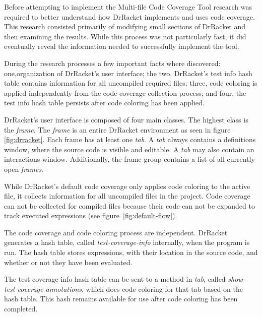 Before attempting to implement the Multi-file Code Coverage Tool research was required to better understand how DrRacket implements and uses code coverage. This research consisted primarily of modifying small sections of DrRacket and then examining the results. While this process was not particularly fast, it did eventually reveal the information needed to successfully implement the tool.

During the research processes a few important facts where discovered: one,organization of DrRacket's user interface; the two, DrRacket's test info hash table contains information for all uncompiled required files; three, code coloring is applied independently from the code coverage collection process; and four, the test info hash table persists after code coloring has been applied.

DrRacket's user interface is composed of four main classes. The highest class is the \emph{frame}. The \emph{frame} is an entire DrRacket environment as seen in figure \ref{fig:drracket}. Each frame has at least one \emph{tab}. A \emph{tab} always contains a definitions window, where the source code is visible and editable. A \emph{tab} may also contain an interactions window. Additionally, the frame group contains a list of all currently open \emph{frames}.


While DrRacket's default code coverage only applies code coloring to the active file, it collects information for all uncompiled files in the project. Code coverage can not be collected for compiled files because their code can not be expanded to track executed expressions (see figure~\ref{fig:default-flow}). 

The code coverage and code coloring process are independent. DrRacket generates a hash table, called \emph{test-coverage-info} internally, when the program is run. The hash table stores expressions, with their location in the source code, and whether or not they have been evaluated. 

The test coverage info hash table can be sent to a method in \emph{tab}, called \emph{show-test-coverage-annotations}, which does code coloring for that tab based on the hash table. This hash remains available for use after code coloring has been completed. 

